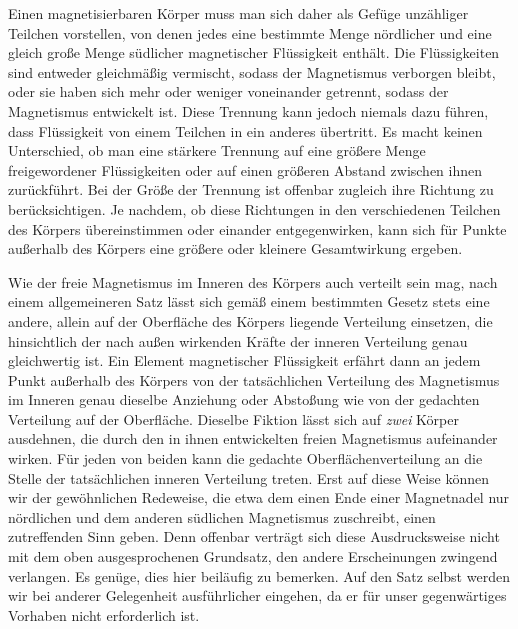 Einen magnetisierbaren Körper muss man sich daher als Gefüge unzähliger Teilchen vorstellen, von denen jedes eine bestimmte Menge nördlicher und eine gleich große Menge südlicher magnetischer Flüssigkeit enthält. Die Flüssigkeiten sind entweder gleichmäßig vermischt, sodass der Magnetismus verborgen bleibt, oder sie haben sich mehr oder weniger voneinander getrennt, sodass der Magnetismus entwickelt ist. Diese Trennung kann jedoch niemals dazu führen, dass Flüssigkeit von einem Teilchen in ein anderes übertritt. Es macht keinen Unterschied, ob man eine stärkere Trennung auf eine größere Menge freigewordener Flüssigkeiten oder auf einen größeren Abstand zwischen ihnen zurückführt. Bei der Größe der Trennung ist offenbar zugleich ihre Richtung zu berücksichtigen. Je nachdem, ob diese Richtungen in den verschiedenen Teilchen des Körpers übereinstimmen oder einander entgegenwirken, kann sich für Punkte außerhalb des Körpers eine größere oder kleinere Gesamtwirkung ergeben.

Wie der freie Magnetismus im Inneren des Körpers auch verteilt sein mag, nach einem allgemeineren Satz lässt sich gemäß einem bestimmten Gesetz stets eine andere, allein auf der Oberfläche des Körpers liegende Verteilung einsetzen, die hinsichtlich der nach außen wirkenden Kräfte der inneren Verteilung genau gleichwertig ist. Ein Element magnetischer Flüssigkeit erfährt dann an jedem Punkt außerhalb des Körpers von der tatsächlichen Verteilung des Magnetismus im Inneren genau dieselbe Anziehung oder Abstoßung wie von der gedachten Verteilung auf der Oberfläche. Dieselbe Fiktion lässt sich auf \textit{zwei} Körper ausdehnen, die durch den in ihnen entwickelten freien Magnetismus aufeinander wirken. Für jeden von beiden kann die gedachte Oberflächenverteilung an die Stelle der tatsächlichen inneren Verteilung treten. Erst auf diese Weise können wir der gewöhnlichen Redeweise, die etwa dem einen Ende einer Magnetnadel nur nördlichen und dem anderen südlichen Magnetismus zuschreibt, einen zutreffenden Sinn geben. Denn offenbar verträgt sich diese Ausdrucksweise nicht mit dem oben ausgesprochenen Grundsatz, den andere Erscheinungen zwingend verlangen. Es genüge, dies hier beiläufig zu bemerken. Auf den Satz selbst werden wir bei anderer Gelegenheit ausführlicher eingehen, da er für unser gegenwärtiges Vorhaben nicht erforderlich ist.

